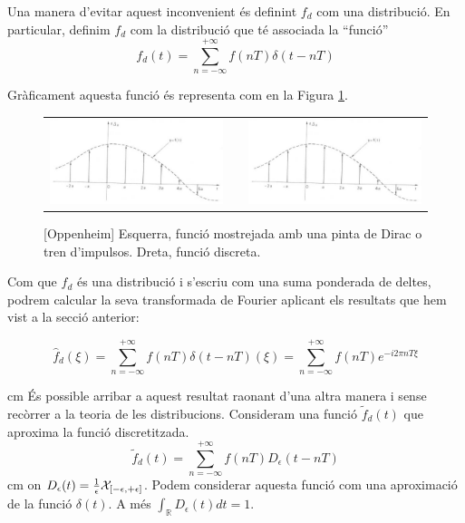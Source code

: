 \documentclass{article}
\def\R{\mathbb R}
\begin{document}
Una manera d'evitar aquest inconvenient \'es definint $f_d$ com una
distribuci\'o. En particular, definim $f_d$ com la distribuci\'o
que t\'e associada la ``funci\'o''
\begin{equation}
\label{sampledf}
f_d(t)=\sum_{n=-\infty}^{+\infty} f(nT) \delta(t-nT)
\end{equation}

Gr\`aficament aquesta funci\'o \'es representa com en la Figura 
\ref{sampled.fig}.

\begin{figure}[htbp]
\begin{tabular}{lcr}
\includegraphics[width=6cm]{imatges/sampledf.eps} & &
\includegraphics[width=6cm]{imatges/sampledf.eps}
\end{tabular}
\caption{[Oppenheim] Esquerra, funci\'o mostrejada amb
una pinta de Dirac o tren d'impulsos. Dreta, funci\'o discreta.}
\label{sampled.fig}
\end{figure}

Com que $f_d$ \'es una distribuci\'o i s'escriu com una suma ponderada de
deltes, podrem calcular la seva transformada de Fourier aplicant els resultats
que hem vist a la secci\'o anterior:

\begin{equation}
\label{sampledFT}
\hat{f}_d(\xi)=\sum_{n=-\infty}^{+\infty} f(nT) \widehat{\delta(t-nT)}(\xi)=
\sum_{n=-\infty}^{+\infty} f(nT) e^{- i 2 \pi n T \xi}
\end{equation}

 cm
\'Es possible arribar a aquest resultat raonant d'una altra manera i sense
rec\`orrer a la teoria de les distribucions.
\newline
Consideram una funci\'o $\tilde{f}_d(t)$ que aproxima la funci\'o 
discretitzada.
\[
\tilde{f}_d(t)=\sum_{n=-\infty}^{+\infty} f(nT) D_\epsilon(t-nT)
\]
 cm
\noindent
on $D_\epsilon(t)=\frac{1}{\epsilon} {\cal X}_{[-\epsilon, +\epsilon]}$.
Podem considerar aquesta funci\'o com una aproximaci\'o de la funci\'o
$\delta(t)$. A m\'es $\int_\R D_\epsilon (t) dt = 1$.
\end{document}
